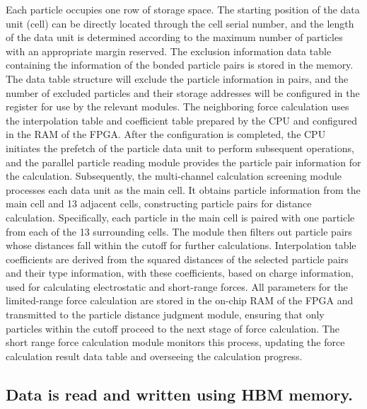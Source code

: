 \documentclass{article}
\begin{document}
\noindent
Each particle occupies one row of storage space. 
The starting position of the data unit (cell) 
can be directly located through the cell serial number,
and the length of the data unit is determined according to the maximum number 
of particles with an appropriate margin reserved. 
The exclusion information data table containing the information of the bonded 
particle pairs is stored in the memory.
The data table structure will exclude the particle information in pairs, and 
the number of excluded particles and their storage addresses will be configured 
in the register for use by the relevant modules.
The neighboring force calculation uses the interpolation table and coefficient 
table prepared by the CPU and configured in the RAM of the FPGA.
After the configuration is completed, the CPU initiates the prefetch of the 
particle data unit to perform subsequent operations, and the parallel particle 
reading module provides the particle pair information for the calculation.
Subsequently, the multi-channel calculation screening module processes each 
data unit as the main cell.
It obtains particle information from the main cell and 13 adjacent cells, 
constructing particle pairs for distance calculation. 
Specifically, each particle in the main cell is paired with one particle from 
each of the 13 surrounding cells. 
The module then filters out particle pairs whose distances fall within the 
cutoff for further calculations. 
Interpolation table coefficients are derived from the squared distances of the 
selected particle pairs and their type information, with these coefficients, 
based on charge information, used for calculating electrostatic and short-range 
forces. 
All parameters for the limited-range force calculation are stored in the 
on-chip RAM of the FPGA and transmitted to the particle distance judgment 
module, ensuring that only particles within the cutoff proceed to the next 
stage of force calculation. 
The short range force calculation module monitors this process, updating the 
force calculation result data table and overseeing the calculation progress.\\



\subsection{Data is read and written using HBM memory.}
\noindent
\end{document}
